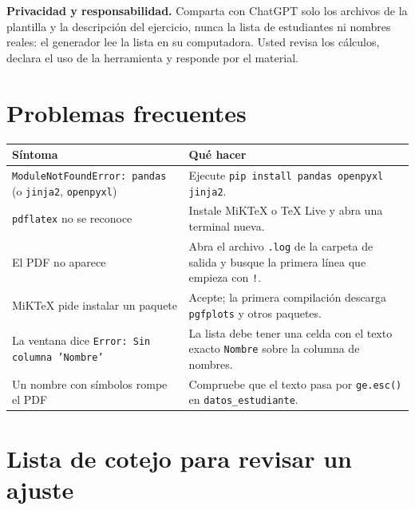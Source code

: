 \documentclass[11pt]{article}
\newcommand{\cod}[1]{\texttt{#1}}
\begin{document}
\begin{nota}
\textbf{Privacidad y responsabilidad.} Comparta con ChatGPT solo los archivos de la plantilla y la descripción del ejercicio, nunca la lista de estudiantes ni nombres reales: el generador lee la lista en su computadora. Usted revisa los cálculos, declara el uso de la herramienta y responde por el material.
\end{nota}

\section{Problemas frecuentes}\label{sec:problemas}

\begin{tabularx}{\linewidth}{@{}>{\raggedright\arraybackslash}p{5.2cm}X@{}}
\toprule
\textbf{Síntoma} & \textbf{Qué hacer} \\ \midrule
\cod{ModuleNotFoundError: pandas} (o \cod{jinja2}, \cod{openpyxl}) & Ejecute \cod{pip install pandas openpyxl jinja2}. \\
\cod{pdflatex} no se reconoce & Instale MiKTeX o TeX Live y abra una terminal nueva. \\
El PDF no aparece & Abra el archivo \cod{.log} de la carpeta de salida y busque la primera línea que empieza con \cod{!}. \\
MiKTeX pide instalar un paquete & Acepte; la primera compilación descarga \cod{pgfplots} y otros paquetes. \\
La ventana dice \cod{Error: Sin columna 'Nombre'} & La lista debe tener una celda con el texto exacto \cod{Nombre} sobre la columna de nombres. \\
Un nombre con símbolos rompe el PDF & Compruebe que el texto pasa por \cod{ge.esc()} en \cod{datos\_estudiante}. \\ \bottomrule
\end{tabularx}

\section{Lista de cotejo para revisar un ajuste}\label{sec:cotejo}
\end{document}
